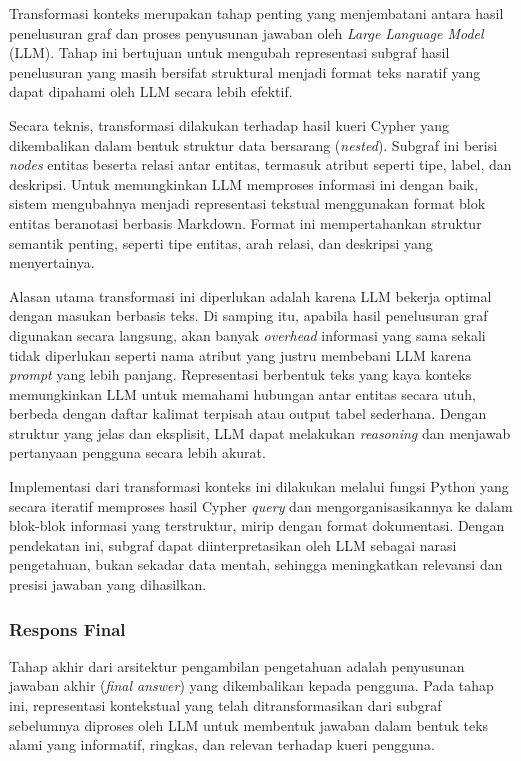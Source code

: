 Transformasi konteks merupakan tahap penting yang menjembatani antara hasil penelusuran graf dan proses penyusunan jawaban oleh \textit{Large Language Model} (LLM).
Tahap ini bertujuan untuk mengubah representasi subgraf hasil penelusuran yang masih bersifat struktural menjadi format teks naratif yang dapat dipahami oleh LLM secara lebih efektif.

Secara teknis, transformasi dilakukan terhadap hasil kueri Cypher yang dikembalikan dalam bentuk struktur data bersarang (\textit{nested}).
Subgraf ini berisi \textit{nodes} entitas beserta relasi antar entitas, termasuk atribut seperti tipe, label, dan deskripsi.
Untuk memungkinkan LLM memproses informasi ini dengan baik, sistem mengubahnya menjadi representasi tekstual menggunakan format blok entitas beranotasi berbasis Markdown.
Format ini mempertahankan struktur semantik penting, seperti tipe entitas, arah relasi, dan deskripsi yang menyertainya.

Alasan utama transformasi ini diperlukan adalah karena LLM bekerja optimal dengan masukan berbasis teks.
Di samping itu, apabila hasil penelusuran graf digunakan secara langsung, akan banyak \textit{overhead} informasi yang sama sekali tidak diperlukan seperti nama atribut yang justru membebani LLM karena \textit{prompt} yang lebih panjang.
Representasi berbentuk teks yang kaya konteks memungkinkan LLM untuk memahami hubungan antar entitas secara utuh, berbeda dengan daftar kalimat terpisah atau output tabel sederhana.
Dengan struktur yang jelas dan eksplisit, LLM dapat melakukan \textit{reasoning} dan menjawab pertanyaan pengguna secara lebih akurat.

Implementasi dari transformasi konteks ini dilakukan melalui fungsi Python yang secara iteratif memproses hasil Cypher \textit{query} dan mengorganisasikannya ke dalam blok-blok informasi yang terstruktur, mirip dengan format dokumentasi.
Dengan pendekatan ini, subgraf dapat diinterpretasikan oleh LLM sebagai narasi pengetahuan, bukan sekadar data mentah, sehingga meningkatkan relevansi dan presisi jawaban yang dihasilkan.

\subsubsection{Respons Final}
Tahap akhir dari arsitektur pengambilan pengetahuan adalah penyusunan jawaban akhir (\textit{final answer}) yang dikembalikan kepada pengguna.
Pada tahap ini, representasi kontekstual yang telah ditransformasikan dari subgraf sebelumnya diproses oleh LLM untuk membentuk jawaban dalam bentuk teks alami yang informatif, ringkas, dan relevan terhadap kueri pengguna.

